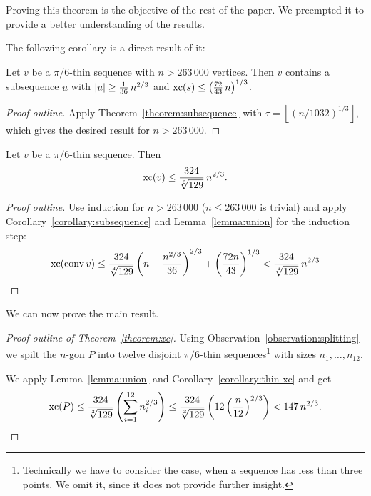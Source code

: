 Proving this theorem is the objective of the rest of the paper. We preempted it to provide a better understanding of the results.

The following corollary is a direct result of it: 

\begin{corollary}\label{corollary:subsequence}
  Let $v$ be a $\pi/6$-thin sequence with $n > 263\,000$ vertices. 
  Then $v$ contains a subsequence $u$ with $\lvert u\rvert \geq \frac{1}{36}\,n^{2/3}$ and $\operatorname{xc}(s) \leq \left( \frac{72}{43}\,n \right)^{1/3}$.
\end{corollary}

\begin{proof}[Proof outline]
  Apply Theorem~\ref{theorem:subsequence} with $\tau=\left\lfloor (n/1032)^{1/3} \right\rfloor$, which gives the desired result for $n > 263\,000$.
\end{proof}

\begin{corollary}\label{corollary:thin-xc}
  Let $v$ be a $\pi/6$-thin sequence. Then $$\operatorname{xc}(v) \leq \frac{324}{\sqrt[3]{129}}\,n^{2/3} .$$
\end{corollary}

\begin{proof}[Proof outline]
  Use induction for $n > 263\,000$ ($n \leq 263\,000$ is trivial) and apply Corollary~\ref{corollary:subsequence} and Lemma~\ref{lemma:union} for the induction step: $$\operatorname{xc}(\operatorname{conv} v) \leq \frac{324}{\sqrt[3]{129}} \left(n-\frac{n^{2/3}}{36}\right)^{2/3}+\left(\frac{72n}{43}\right)^{1/3} < \frac{324}{\sqrt[3]{129}}\,n^{2/3}$$
\end{proof}

We can now prove the main result.

\begin{proof}[Proof outline of Theorem~\ref{theorem:xc}]
  Using Observation~\ref{observation:splitting} we spilt the $n$-gon $P$ into twelve disjoint $\pi/6$-thin sequences\footnote{Technically we have to consider the case, when a sequence has less than three points. We omit it, since it does not provide further insight.} with sizes $n_1,\dots,n_{12}$.

  We apply Lemma~\ref{lemma:union} and Corollary~\ref{corollary:thin-xc} and get $$\operatorname{xc}(P)\leq\frac{324}{\sqrt[3]{129}}\left(\sum\limits_{i=1}^{12}n_i^{2/3}\right)\leq\frac{324}{\sqrt[3]{129}}\left(12\left(\frac{n}{12}\right)^{2/3}\right) < 147\,n^{2/3} .$$
\end{proof}



